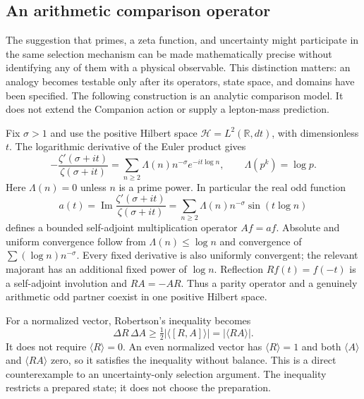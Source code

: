 \subsection{An arithmetic comparison operator}

The suggestion that primes, a zeta function, and uncertainty might
participate in the same selection mechanism can be made mathematically
precise without identifying any of them with a physical observable.
This distinction matters: an analogy becomes testable only after its
operators, state space, and domains have been specified. The following
construction is an analytic comparison model. It does not extend the
Companion action or supply a lepton-mass prediction.

Fix $\sigma>1$ and use the positive Hilbert space
$\mathcal H=L^2(\mathbb R,dt)$, with dimensionless $t$. The logarithmic
derivative of the Euler product gives \cite{DLMF274}
\begin{equation}
 -\frac{\zeta'(\sigma+it)}{\zeta(\sigma+it)}
 =\sum_{n\geq2}\Lambda(n)n^{-\sigma}e^{-it\log n},
 \qquad
 \Lambda(p^k)=\log p.
\end{equation}
Here $\Lambda(n)=0$ unless $n$ is a prime power. In particular the
real odd function
\begin{equation}
 a(t)=\operatorname{Im}\frac{\zeta'(\sigma+it)}{\zeta(\sigma+it)}
     =\sum_{n\geq2}\Lambda(n)n^{-\sigma}\sin(t\log n)
\end{equation}
defines a bounded self-adjoint multiplication operator $Af=af$.
Absolute and uniform convergence follow from
$\Lambda(n)\leq\log n$ and convergence of
$\sum (\log n)n^{-\sigma}$. Every fixed derivative is also uniformly
convergent; the relevant majorant has an additional fixed power of
$\log n$. Reflection $Rf(t)=f(-t)$ is a self-adjoint involution and
$RA=-AR$. Thus a parity operator and a genuinely arithmetic odd
partner coexist in one positive Hilbert space.

For a normalized vector, Robertson's inequality \cite{Robertson1929}
becomes
\begin{equation}
 \Delta R\,\Delta A\geq
 \tfrac12|\langle[R,A]\rangle|=|\langle RA\rangle|.
\end{equation}
It does not require $\langle R\rangle=0$. An even normalized vector
has $\langle R\rangle=1$ and both $\langle A\rangle$ and
$\langle RA\rangle$ zero, so it satisfies the inequality without
balance. This is a direct counterexample to an uncertainty-only
selection argument. The inequality restricts a prepared state; it
does not choose the preparation.

